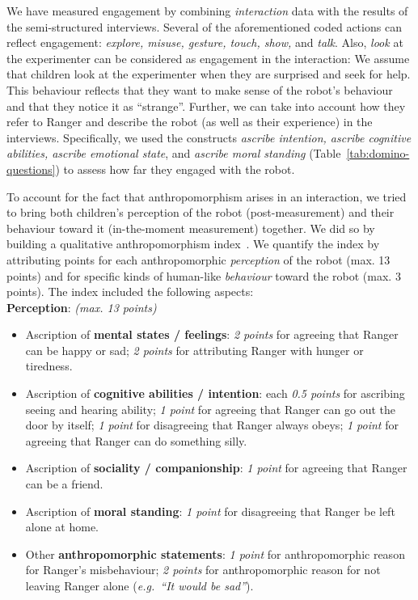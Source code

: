 \documentclass{sig-alternate}
\newcommand{\eg}{{\textit{e.g.~}}}
\begin{document}
We have measured engagement by combining \emph{interaction}
data with the results of the semi-structured interviews.  Several of the
aforementioned coded actions can reflect engagement: \textit{explore, misuse,
gesture, touch, show,} and \textit{talk}. Also, \textit{look} at the
experimenter can be considered as engagement in the interaction: We assume that
children look at the experimenter when they are surprised and seek for help.
This behaviour reflects that they want to make sense of the robot's behaviour and
that they notice it as ``strange''. Further, we can take into account how they
refer to Ranger and describe the robot (as well as their experience) in the
interviews.  Specifically, we used the constructs \textit{ascribe intention,
ascribe cognitive abilities, ascribe emotional state}, and \textit{ascribe
moral standing} (Table~\ref{tab:domino-questions}) to assess how far they
engaged with the robot.

To account for the fact that anthropomorphism arises in an interaction, we tried
to bring both children's perception of the robot (post-measurement) and their
behaviour toward it (in-the-moment measurement) together. We did so by building
a qualitative anthropomorphism index~\cite{fink2014dynamics}. We quantify the
index by attributing points for each anthropomorphic \emph{perception} of the
robot (max.  13 points) and for specific kinds of human-like \emph{behaviour}
toward the robot (max.  3 points). The index included the following aspects:\\

\textbf{Perception}: \textit{(max. 13 points)}

\begin{itemize}
    \item Ascription of \textbf{mental states / feelings}: \textit{2 points} for agreeing
            that Ranger can be happy or sad; \textit{2 points} for attributing Ranger with
        hunger or tiredness.

    \item Ascription of \textbf{cognitive abilities / intention}: each \textit{0.5
        points} for ascribing seeing and hearing ability; \textit{1 point} for agreeing
            that Ranger can go out the door by itself; \textit{1 point} for disagreeing that
            Ranger always obeys; \textit{1 point} for agreeing that Ranger can do something
        silly.

    \item Ascription of \textbf{sociality / companionship}: \textit{1 point} for agreeing
        that Ranger can be a friend.

    \item Ascription of \textbf{moral standing}: \textit{1 point} for disagreeing that
        Ranger be left alone at home.

    \item Other \textbf{anthropomorphic statements}: \textit{1 point} for anthropomorphic
        reason for Ranger's misbehaviour; \textit{2 points} for anthropomorphic reason
        for not leaving Ranger alone (\eg \textit{``It would be sad''}).

\end{itemize}
\end{document}
